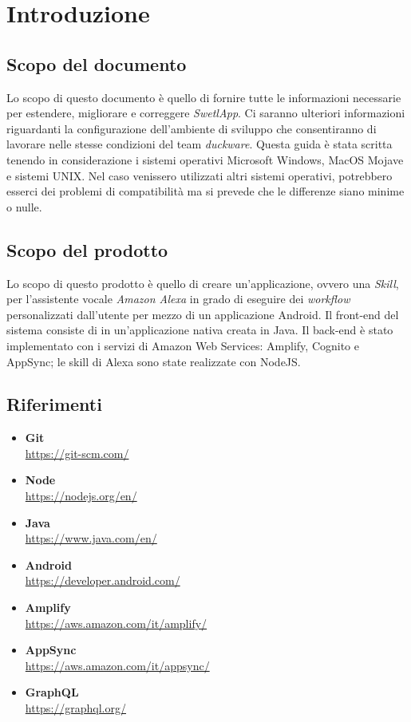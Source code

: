 \clearpage
\section{Introduzione}
\label{sec:intro}
\subsection{Scopo del documento}
Lo scopo di questo documento è quello di fornire tutte le informazioni necessarie per estendere, migliorare e correggere \textit{SwetlApp}. Ci saranno ulteriori informazioni riguardanti la configurazione dell'ambiente di sviluppo che consentiranno di lavorare nelle stesse condizioni del team \textit{duckware}. 
Questa guida è stata scritta tenendo in considerazione i sistemi operativi Microsoft Windows, MacOS Mojave e sistemi UNIX. Nel caso venissero utilizzati altri sistemi operativi, potrebbero esserci dei problemi di compatibilità ma si prevede che le differenze siano minime o nulle.
\subsection{Scopo del prodotto}
Lo scopo di questo prodotto è quello di creare un'applicazione, ovvero una \textit{Skill}, per l'assistente vocale \textit{Amazon Alexa} in grado di eseguire dei \textit{workflow} personalizzati dall'utente per mezzo di un applicazione Android.
Il front-end del sistema consiste di in un'applicazione nativa creata in Java. Il back-end è stato implementato con i servizi di Amazon Web Services: Amplify, Cognito e AppSync; le skill di Alexa sono state realizzate con NodeJS.
\subsection{Riferimenti}
\begin{itemize}
    \item \textbf{Git}\\ \href{https://git-scm.com/}{https://git-scm.com/}
    \item \textbf{Node}\\ \href{https://nodejs.org/en/}{https://nodejs.org/en/}
    \item \textbf{Java}\\ \href{https://www.java.com/en/}{https://www.java.com/en/}
    \item \textbf{Android}\\ \href{https://developer.android.com/}{https://developer.android.com/}
    \item \textbf{Amplify}\\ \href{https://aws.amazon.com/it/amplify/}{https://aws.amazon.com/it/amplify/}
    \item \textbf{AppSync}\\ \href{https://aws.amazon.com/it/appsync/}{https://aws.amazon.com/it/appsync/}
    \item \textbf{GraphQL}\\ \href{https://graphql.org/}{https://graphql.org/}
    
\end{itemize}